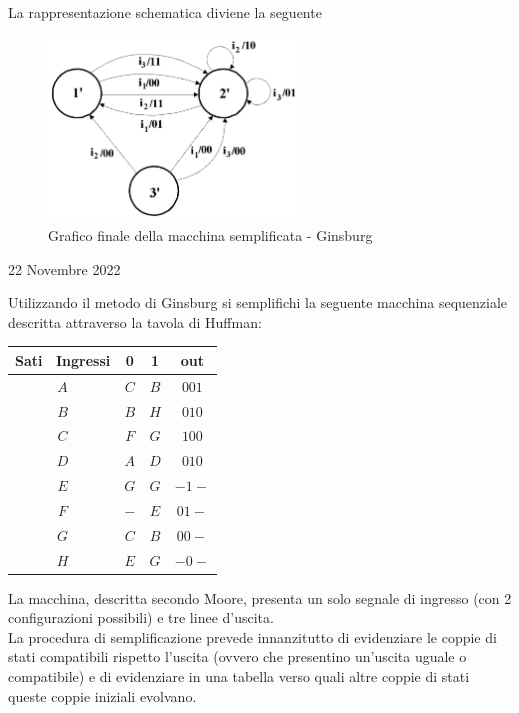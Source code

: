 \documentclass[a4paper]{extarticle}
\renewcommand\arraystretch{}
\begin{document}
La rappresentazione schematica diviene la seguente
\begin{figure}[H]
    \centering
    \includegraphics[width=0.6\textwidth]{metodo-ginsburg-4.png}
    \caption{Grafico finale della macchina semplificata - Ginsburg}
    \label{fig:metodo_ginsburg_4}
\end{figure}

\newpage
\begin{center}
    22 Novembre 2022
\end{center}
Utilizzando il metodo di Ginsburg si semplifichi la seguente macchina sequenziale descritta attraverso la tavola di Huffman:

\vspace{1em}
\noindent
\begin{table}[H]
\setlength{\tabcolsep}{4pt}
\renewcommand{\arraystretch}{1.2}
\centering
\begin{tabular}{c|cc|c}
    \textbf{Sati \ Ingressi} & \textbf{0} & \textbf{1} & \textbf{out}\\
    \hline
    $A$ & $C$ & $B$ & $001$\\
    $B$ & $B$ & $H$ & $010$\\
    $C$ & $F$ & $G$ & $100$\\
    $D$ & $A$ & $D$ & $010$\\
    $E$ & $G$ & $G$ & $-1-$\\
    $F$ & $-$ & $E$ & $01-$\\
    $G$ & $C$ & $B$ & $00-$\\
    $H$ & $E$ & $G$ & $-0-$\\
\end{tabular}
\end{table}

\vspace{1em}
\noindent
La macchina, descritta secondo Moore, presenta un solo segnale di ingresso (con 2 configurazioni possibili) e tre linee d'uscita.\\
La procedura di semplificazione prevede innanzitutto di evidenziare le coppie di stati compatibili rispetto l'uscita (ovvero che presentino un'uscita uguale o compatibile) e di evidenziare in una tabella verso quali altre coppie di stati queste coppie iniziali evolvano.
\end{document}
